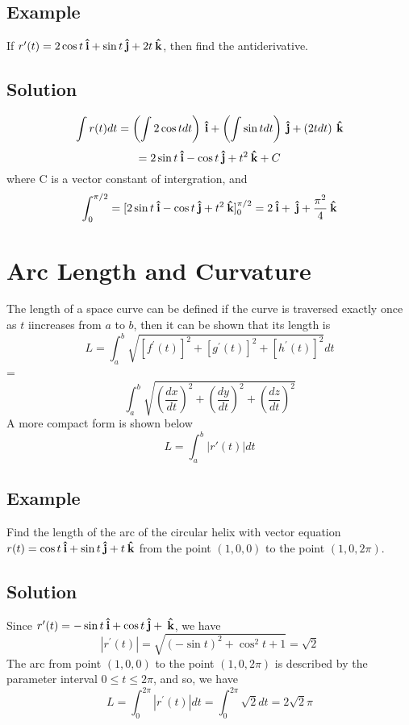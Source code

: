 \subsection*{Example}
If $r'(t) = 2\cos{t}\:\boldsymbol{\hat{\textbf{i}}} + \sin{t}\:\boldsymbol{\hat{\textbf{j}}} + 2t\:\boldsymbol{\hat{\textbf{k}}}$, then find the antiderivative. 
\subsection*{Solution}
$$\int r(t) dt = \left(\int 2\cos{t} dt\right)\:\boldsymbol{\hat{\textbf{i}}} + \left(\int \sin{t} dt\right)\:\boldsymbol{\hat{\textbf{j}}} + \left(2t dt\right)\:\boldsymbol{\hat{\textbf{k}}}$$ $$= 2\sin{t}\:\boldsymbol{\hat{\textbf{i}}} - \cos{t}\:\boldsymbol{\hat{\textbf{j}}} + t^2\:\boldsymbol{\hat{\textbf{k}}} + C$$
where C is a vector constant of intergration, and 
$$\int^{\pi/2}_0 = [2\sin{t}\:\boldsymbol{\hat{\textbf{i}}} - \cos{t}\:\boldsymbol{\hat{\textbf{j}}} + t^2\:\boldsymbol{\hat{\textbf{k}}}]^{\pi/2}_0 = 2\:\boldsymbol{\hat{\textbf{i}}} + \:\boldsymbol{\hat{\textbf{j}}} + \frac{\pi^2}{4}\:\boldsymbol{\hat{\textbf{k}}}$$

\section{Arc Length and Curvature}
The length of a space curve can be defined if the curve is traversed exactly once as $t$ iincreases from $a$ to $b$, then it can be shown that its length is 
$$L = \int^b_a \sqrt{[f^\prime(t)]^2 + [g^\prime(t)]^2 + [h^\prime(t)]^2} dt$$ = $$\int^b_a \sqrt{(\frac{dx}{dt})^2 + (\frac{dy}{dt})^2 + (\frac{dz}{dt})^2}$$
A more compact form is shown below $$L = \int^b_a |r'(t)| dt$$

\subsection*{Example}
Find the length of the arc of the circular helix with vector equation $r(t) = \cos{t}\:\boldsymbol{\hat{\textbf{i}}} + \sin{t}\:\boldsymbol{\hat{\textbf{j}}} + t\:\boldsymbol{\hat{\textbf{k}}}$ from the point $(1,0,0)$ to the point $(1, 0, 2\pi)$.
\subsection*{Solution}
Since $r^\prime(t) = -\sin{t}\:\boldsymbol{\hat{\textbf{i}}} + \cos{t}\:\boldsymbol{\hat{\textbf{j}}} + \:\boldsymbol{\hat{\textbf{k}}}$, we have $$|r^\prime(t)| = \sqrt{(-\sin{t})^2 + \cos^2{t} + 1} = \sqrt{2}$$
The arc from point $(1,0,0)$ to the point $(1, 0, 2\pi)$ is described by the parameter interval $0 \leq t \leq 2\pi$,  and so, we have
$$L = \int^{2\pi}_0|r^\prime(t)| dt = \int^{2\pi}_0 \sqrt{2} dt = 2\sqrt{2}\pi$$

